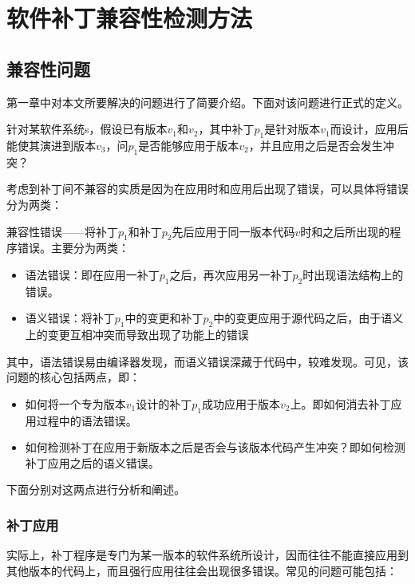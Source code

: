 \chapter{软件补丁兼容性检测方法}
\section{兼容性问题}
\label {define_problem}
第一章中对本文所要解决的问题进行了简要介绍。下面对该问题进行正式的定义。

	针对某软件系统s，假设已有版本$v_1$和$v_2$，其中补丁$p_1$是针对版本$v_1$而设计，应用后能使其演进到版本$v_3$，问$p_1$是否能够应用于版本$v_{2}$，并且应用之后是否会发生冲突？

考虑到补丁间不兼容的实质是因为在应用时和应用后出现了错误，可以具体将错误分为两类：

\begin{definition}
	兼容性错误——将补丁$p_1$和补丁$p_2$先后应用于同一版本代码$v$时和之后所出现的程序错误。主要分为两类：
	\begin{itemize}
		\item 语法错误：即在应用一补丁$p_1$之后，再次应用另一补丁$p_2$时出现语法结构上的错误。
		\item 语义错误：将补丁$p_1$中的变更和补丁$p_2$中的变更应用于源代码之后，由于语义上的变更互相冲突而导致出现了功能上的错误
	\end{itemize}
\end{definition}

其中，语法错误易由编译器发现，而语义错误深藏于代码中，较难发现。可见，该问题的核心包括两点，即：
\begin{itemize}
	\item 如何将一个专为版本$v_1$设计的补丁$p_1$成功应用于版本$v_2$上。即如何消去补丁应用过程中的语法错误。
	\item 如何检测补丁在应用于新版本之后是否会与该版本代码产生冲突？即如何检测补丁应用之后的语义错误。
\end{itemize}

下面分别对这两点进行分析和阐述。

\subsection{补丁应用}

实际上，补丁程序是专门为某一版本的软件系统所设计，因而往往不能直接应用到其他版本的代码上，而且强行应用往往会出现很多错误。常见的问题可能包括：

